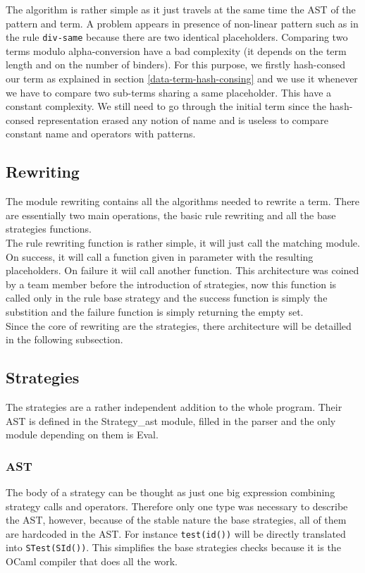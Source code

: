 \documentclass[12pt,a4paper]{article}
\begin{document}
The algorithm is rather simple as it just travels at the same time the AST of the pattern and term. A problem appears in presence of non-linear pattern such as in the rule \texttt{div-same} because there are two identical placeholders. Comparing two terms modulo alpha-conversion have a bad complexity (it depends on the term length and on the number of binders). For this purpose, we firstly hash-consed our term as explained in section \ref{data-term-hash-consing} and we use it whenever we have to compare two sub-terms sharing a same placeholder. This have a constant complexity. We still need to go through the initial term since the hash-consed representation erased any notion of name and is useless to compare constant name and operators with patterns.

\subsection{Rewriting}
\label{rewriting}
The module rewriting contains all the algorithms needed to rewrite a term. There
are essentially two main operations, the basic rule rewriting and all the base
strategies functions. \\

The rule rewriting  function is rather simple, it will just call the matching module.
On success, it will call a function given in parameter with the resulting 
placeholders. On failure it wiil call another function. This architecture was coined
by a team member before the introduction of strategies, now this function is
called only in the rule base strategy and the success function is simply the 
substition and the failure function is simply returning the empty set.\\

Since the core of rewriting are the strategies, there architecture will be detailled
in the following subsection.

\subsection{Strategies}
The strategies are a rather independent addition to the whole program. Their AST is 
defined in the Strategy\_ast module, filled in the parser and the only module 
depending on them is Eval. 

\subsubsection*{AST}
The body of a strategy can be thought as just one big expression combining strategy
calls and operators. Therefore only one type was necessary to describe the AST, 
however, because of the stable nature the base strategies, all of them are 
hardcoded in the AST. For instance \verb|test(id())| will be directly translated into
\verb|STest(SId())|. This simplifies the base strategies checks because it is the 
OCaml compiler that does all the work.
\end{document}
